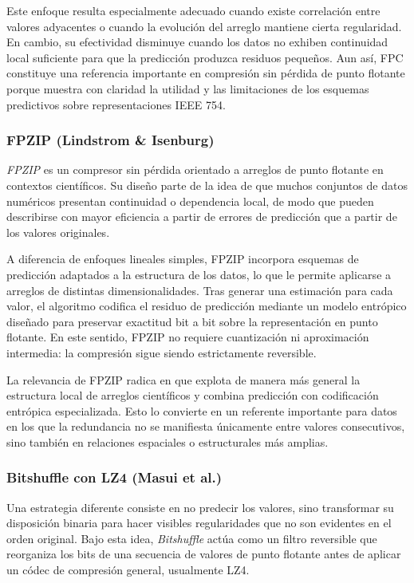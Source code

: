 Este enfoque resulta especialmente adecuado cuando existe correlación entre valores
adyacentes o cuando la evolución del arreglo mantiene cierta regularidad. En cambio, su
efectividad disminuye cuando los datos no exhiben continuidad local suficiente para que
la predicción produzca residuos pequeños. Aun así, FPC constituye una referencia
importante en compresión sin pérdida de punto flotante porque muestra con claridad la
utilidad y las limitaciones de los esquemas predictivos sobre representaciones IEEE 754.

\subsubsection{FPZIP (Lindstrom \& Isenburg)}

\textit{FPZIP}\parencite{lindstrom2006fpzip} es un compresor sin pérdida orientado a arreglos
de punto flotante en contextos científicos. Su diseño parte de la idea de que muchos
conjuntos de datos numéricos presentan continuidad o dependencia local, de modo que
pueden describirse con mayor eficiencia a partir de errores de predicción que a partir de
los valores originales.

A diferencia de enfoques lineales simples, FPZIP incorpora esquemas de predicción
adaptados a la estructura de los datos, lo que le permite aplicarse a arreglos de
distintas dimensionalidades. Tras generar una estimación para cada valor, el algoritmo
codifica el residuo de predicción mediante un modelo entrópico diseñado para preservar
exactitud bit a bit sobre la representación en punto flotante. En este sentido, FPZIP no
requiere cuantización ni aproximación intermedia: la compresión sigue siendo
estrictamente reversible.

La relevancia de FPZIP radica en que explota de manera más
general la estructura local de arreglos científicos y combina predicción con codificación
entrópica especializada. Esto lo convierte en un referente importante para datos en los
que la redundancia no se manifiesta únicamente entre valores consecutivos, sino también
en relaciones espaciales o estructurales más amplias.

\subsubsection{Bitshuffle con LZ4 (Masui et al.)}

Una estrategia diferente consiste en no predecir los valores, sino transformar su
disposición binaria para hacer visibles regularidades que no son evidentes en el orden
original. Bajo esta idea, \textit{Bitshuffle}\parencite{masui2015bitshuffle} actúa como un filtro
reversible que reorganiza los bits de una secuencia de valores de punto flotante antes de
aplicar un códec de compresión general, usualmente LZ4.

